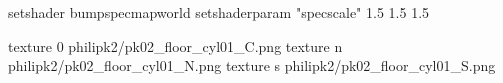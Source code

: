 setshader bumpspecmapworld
setshaderparam "specscale" 1.5 1.5 1.5

texture 0 philipk2/pk02_floor_cyl01_C.png
texture n philipk2/pk02_floor_cyl01_N.png
texture s philipk2/pk02_floor_cyl01_S.png

